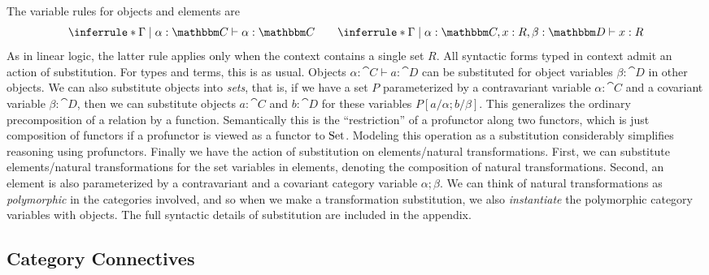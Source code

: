 \documentclass{llncs}
\begin{document}

The variable rules for objects and elements are 
\[
\inferrule*{}{ \Gamma \pipe \alpha : \cat C \vdash \alpha : \cat C}
\qquad
\inferrule*{}{ \Gamma \pipe \alpha : \cat C, x : R, \beta : \cat D \vdash x : R}
\]
As in linear logic, the latter rule applies only when the context
contains a single set $R$.  All syntactic forms typed in context admit
an action of substitution.  For types and terms, this is as
usual. Objects $\alpha:\cat C \vdash a : \cat D$ can be substituted for
object variables $\beta : \cat D$ in other objects. We can also
substitute objects into \emph{sets}, that is, if we have a set $P$
parameterized by a contravariant variable $\alpha : \cat C$ and a
covariant variable $\beta: \cat D$, then we can substitute objects $a :
\cat C$ and $b : \cat D$ for these variables $P[a/\alpha;b/\beta]$. This
generalizes the ordinary precomposition of a relation by a function.
Semantically this is the ``restriction'' of a profunctor along two
functors, which is just composition of functors if a profunctor is
viewed as a functor to $\textrm{Set}$. Modeling this operation as a substitution
considerably simplifies reasoning using profunctors.
%
Finally we have the action of substitution on elements/natural transformations.
First, we can substitute elements/natural transformations for the set
variables in elements, denoting the composition of natural
transformations.  Second, an element is also parameterized
by a contravariant and a covariant category variable $\alpha;\beta$. We
can think of natural transformations as \emph{polymorphic} in the
categories involved, and so when we make a transformation substitution,
we also \emph{instantiate} the polymorphic category variables with
objects.
%
The full syntactic details of substitution are included in the appendix.

\subsection{Category Connectives}
\end{document}
